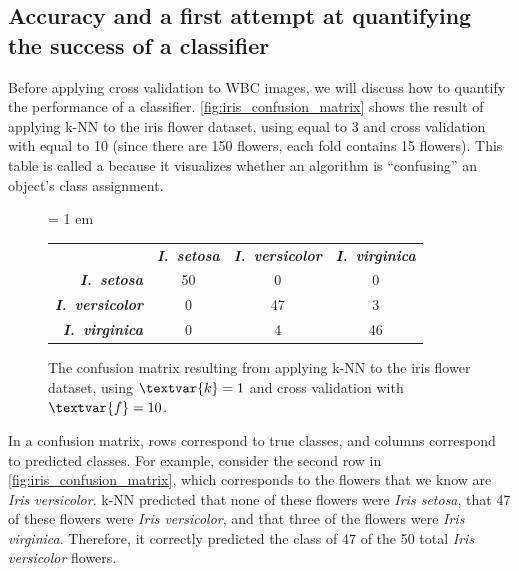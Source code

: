 \FloatBarrier
{}
\subsection{Accuracy and a first attempt at quantifying the success of a classifier}

Before applying cross validation to WBC images, we will discuss how to quantify the performance of a classifier. \autoref{fig:iris_confusion_matrix} shows the result of applying k-NN to the iris flower dataset, using  equal to 3 and cross validation with  equal to 10 (since there are 150 flowers, each fold contains 15 flowers). This table is called a  because it visualizes whether an algorithm is ``confusing'' an object's class assignment.

\begin{figure}[h]
\centering
\tabcolsep = 1 em
\mySfFamily
{}
\begin{tabular}{r c c c}
\rowcolor{gray!50}
& \textbf{\textit{I.~setosa}} & \textbf{\textit{I.~versicolor}} & \textbf{\textit{I.~virginica}} \\
\textbf{\textit{I.~setosa}} & 50 & \phantom{5}0 & \phantom{5}0 \\
\textbf{\textit{I.~versicolor}} & \phantom{5}0 & 47 & \phantom{5}3 \\
\textbf{\textit{I.~virginica}} & \phantom{5}0 & \phantom{5}4 & 46
\end{tabular}
\caption{The confusion matrix resulting from applying k-NN to the iris flower dataset, using $\textvar{k} = \text{1}$ and cross validation with $\textvar{f} = \text{10}$.}
\label{fig:iris_confusion_matrix}
\end{figure}

In a confusion matrix, rows correspond to true classes, and columns correspond to predicted classes. For example, consider the second row in \autoref{fig:iris_confusion_matrix}, which corresponds to the flowers that we know are \textit{Iris versicolor}. k-NN predicted that none of these flowers were \textit{Iris setosa}, that 47 of these flowers were \textit{Iris versicolor}, and that three of the flowers were \textit{Iris virginica}. Therefore, it correctly predicted the class of 47 of the 50 total \textit{Iris versicolor} flowers.\\

